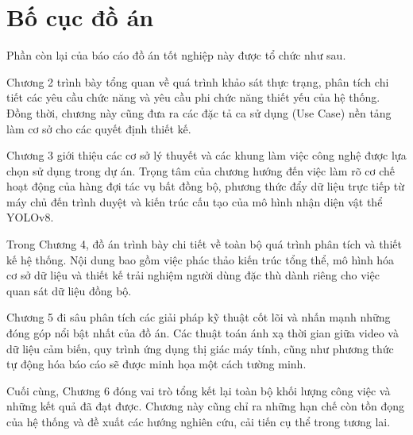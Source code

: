 \documentclass[../DoAn.tex]{subfiles}
\begin{document}
\section{Bố cục đồ án}
\label{section:1.4}
Phần còn lại của báo cáo đồ án tốt nghiệp này được tổ chức như sau.

Chương 2 trình bày tổng quan về quá trình khảo sát thực trạng, phân tích chi tiết các yêu cầu chức năng và yêu cầu phi chức năng thiết yếu của hệ thống. Đồng thời, chương này cũng đưa ra các đặc tả ca sử dụng (Use Case) nền tảng làm cơ sở cho các quyết định thiết kế.

Chương 3 giới thiệu các cơ sở lý thuyết và các khung làm việc công nghệ được lựa chọn sử dụng trong dự án. Trọng tâm của chương hướng đến việc làm rõ cơ chế hoạt động của hàng đợi tác vụ bất đồng bộ, phương thức đẩy dữ liệu trực tiếp từ máy chủ đến trình duyệt và kiến trúc cấu tạo của mô hình nhận diện vật thể YOLOv8.

Trong Chương 4, đồ án trình bày chi tiết về toàn bộ quá trình phân tích và thiết kế hệ thống. Nội dung bao gồm việc phác thảo kiến trúc tổng thể, mô hình hóa cơ sở dữ liệu và thiết kế trải nghiệm người dùng đặc thù dành riêng cho việc quan sát dữ liệu đồng bộ.

Chương 5 đi sâu phân tích các giải pháp kỹ thuật cốt lõi và nhấn mạnh những đóng góp nổi bật nhất của đồ án. Các thuật toán ánh xạ thời gian giữa video và dữ liệu cảm biến, quy trình ứng dụng thị giác máy tính, cũng như phương thức tự động hóa báo cáo sẽ được minh họa một cách tường minh.

Cuối cùng, Chương 6 đóng vai trò tổng kết lại toàn bộ khối lượng công việc và những kết quả đã đạt được. Chương này cũng chỉ ra những hạn chế còn tồn đọng của hệ thống và đề xuất các hướng nghiên cứu, cải tiến cụ thể trong tương lai.
\end{document}
